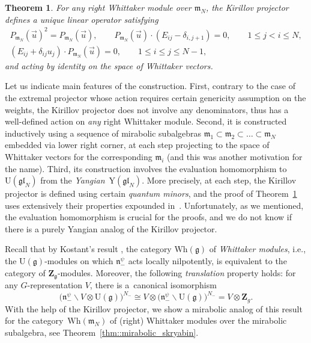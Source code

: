 \documentclass[10pt,a4paper]{article}
\numberwithin{equation}{section}
\newtheorem{thmx}{Theorem}
\newcommand{\Z}{\mathbf{Z}}
\newcommand{\g}{\mathfrak{g}}
\newcommand{\n}{\mathfrak{n}}
\newcommand{\m}{\mathfrak{m}}
\newcommand{\gl}{\mathfrak{gl}}
\begin{document}
	\begin{thmx}
		\label{intro_thm::main_thm}
		For any right Whittaker module over $\m_N$, the Kirillov projector defines a unique linear operator satisfying
		\begin{gather*}
			P_{\m_N}(\vec{u})^2 = P_{\m_N}(\vec{u}), \qquad
			P_{\m_N} (\vec{u})\cdot (E_{ij} - \delta_{i,j+1}) = 0,\qquad 1 \leq j < i \leq N, \\
			(E_{ij} + \delta_{ij} u_j)\cdot P_{\m_N} (\vec{u}) = 0,\qquad 1 \leq i \leq j \leq N-1,
		\end{gather*}
		and acting by identity on the space of Whittaker vectors.
	\end{thmx}
	
	Let us indicate main features of the construction. First, contrary to the case of the extremal projector whose action requires certain genericity assumption on the weights, the Kirillov projector does not involve any denominators, thus has a well-defined action on \emph{any} right Whittaker module. Second, it is constructed inductively using a sequence of mirabolic subalgebras $\m_1 \subset \m_2 \subset \dots \subset \m_N$ embedded via lower right corner, at each step projecting to the space of Whittaker vectors for the corresponding $\m_i$ (and this was another motivation for the name). Third, its construction involves the evaluation homomorphism to $\mathrm{U}(\gl_N)$ from the \emph{Yangian}~$\mathrm{Y}(\gl_N)$. More precisely, at each step, the Kirillov projector is defined using certain \emph{quantum minors}, and the proof of Theorem~\ref{intro_thm::main_thm} uses extensively their properties expounded in~\cite{MolevYangians}. Unfortunately, as we mentioned, the evaluation homomorphism is crucial for the proofs, and we do not know if there is a purely Yangian analog of the Kirillov projector.
	
	Recall that by Kostant's result \cite{Kostant}, the category $\mathrm{Wh}(\g)$ of \emph{Whittaker modules}, i.e., the $\mathrm{U}(\g)$-modules on which $\n_-^{\psi}$ acts locally nilpotently, is equivalent to the category of $\Z_{\g}$-modules. Moreover, the following \emph{translation} property holds: for any $G$-representation $V$, there is a~canonical isomorphism
	\[
	\bigl(\n_-^{\psi} \backslash V \otimes \mathrm{U}(\g)\bigr)^{N_-} \cong V \otimes \bigl(\n_-^{\psi} \backslash \mathrm{U}(\g)\bigr)^{N_-} = V \otimes \Z_{g}.
	\]
	With the help of the Kirillov projector, we show a mirabolic analog of this result for the category~$\mathrm{Wh}(\m_N)$ of (right) Whittaker modules over the mirabolic subalgebra, see Theorem~\ref{thm::mirabolic_skryabin}.
	
\end{document}
